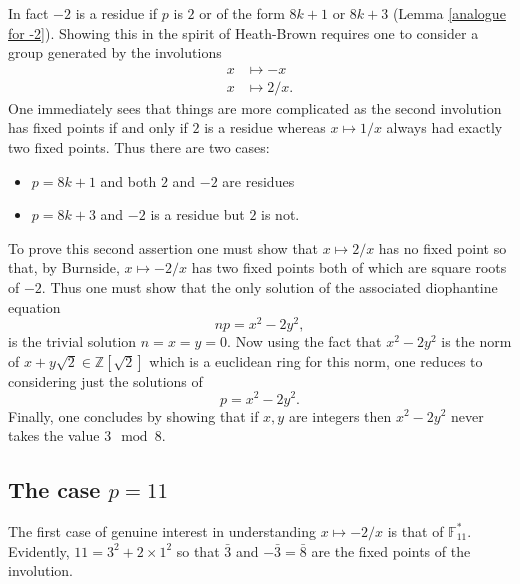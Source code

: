 \documentclass[12pt,a4paper]{amsart}
\begin{document}
In fact  $-2$  is a residue if $p$ is $2$ or of the form $8k+1$ or
$8k+3$ (Lemma \ref{analogue for -2}).
Showing this in the spirit of Heath-Brown requires one to consider a group generated by the involutions 
\begin{eqnarray*}
x & \mapsto -x \\
x & \mapsto 2/x.
\end{eqnarray*}
One immediately sees that things are more complicated as the
second involution has fixed points if and only if $2$ is a residue
whereas $x\mapsto 1/x$ always had exactly two fixed points.
Thus there are two cases:
\begin{itemize}
	\item $p=8k+1$ and both $2$ and $-2$ are residues
	\item $p=8k+3$ and $-2$ is a residue but $2$ is not.
\end{itemize}
To prove this second assertion 
one must show that 
$x  \mapsto 2/x$ has no fixed point
so that, by Burnside,
$x  \mapsto -2/x$ has two fixed points 
both of which are square roots of $-2$.
Thus one must show that the only solution of the associated diophantine equation 
$$np = x^2 - 2y^2,$$
is the trivial solution $n=x=y=0$.
Now using the fact that 
$x^2 - 2y^2$ 
is the norm of $x+y \sqrt{2}\in \mathbb{Z}[\sqrt{2}]$ which is a
euclidean ring for this norm,
one reduces to considering just the solutions of 
$$p = x^2 - 2y^2.$$
Finally, 
one concludes by showing that if $x,y$ are integers then
$x^2 - 2y^2$ never takes the value $3 \mod 8$.

\subsection{The case $p=11$}

The first case of genuine interest in understanding 
$x\mapsto -2/x$ is that of $\mathbb{F}_{11}^*$.
Evidently, $11 = 3^2 + 2\times 1^2$ so that 
$\bar{3}$ and $-\bar{3} = \bar{8}$ are the fixed points of the involution.
\end{document}
